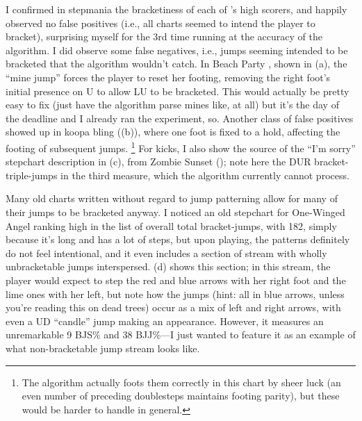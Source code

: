 \documentclass[10pt]{sigplanconf}
\begin{document}
I confirmed in stepmania the bracketiness of each of 's high scorers,
and happily observed no false positives (i.e., all charts seemed to intend the player to bracket),
surprising myself for the 3rd time running at the accuracy of the algorithm.
I did observe some false negatives, i.e., jumps seeming intended to be bracketed that the algorithm wouldn't catch.
In Beach Party \cite{beachparty}, shown in (a),
the ``mine jump'' forces the player to reset her footing,
removing the right foot's initial presence on U to allow LU to be bracketed.
This would actually be pretty easy to fix (just have the algorithm parse mines like, at all)
but it's the day of the deadline and I already ran the experiment, so.
Another class of false positives showed up in koopa bling \cite{koopa} ((b)),
where one foot is fixed to a hold, affecting the footing of subsequent jumps.%
\footnote{The algorithm actually foots them correctly in this chart by sheer luck (an even number of preceding doublesteps maintains footing parity),
but these would be harder to handle in general.}
For kicks, I also show the source of the ``I'm sorry'' stepchart description in (c),
from Zombie Sunset \cite{zombie} ();
note here the DUR bracket-triple-jumps in the third measure,
which the algorithm currently cannot process.

Many old charts written without regard to jump patterning allow for many of their jumps to be bracketed anyway.
I noticed an old stepchart for One-Winged Angel \cite{owa} ranking high in the list of overall total bracket-jumps,
with 182,
simply because it's long and has a lot of steps,
but upon playing, the patterns definitely do not feel intentional,
and it even includes a section of stream with wholly unbracketable jumps interspersed.
(d) shows this section;
in this stream, the player would expect to step the red and blue arrows with her right foot and the lime ones with her left,
but note how the jumps (hint: all in blue arrows, unless you're reading this on dead trees)
occur as a mix of left and right arrows, with even a UD ``candle'' jump making an appearance.
However, it measures an unremarkable 9 BJS\% and 38 BJJ\%---I just wanted to feature it
as an example of what non-bracketable jump stream looks like.
\end{document}
